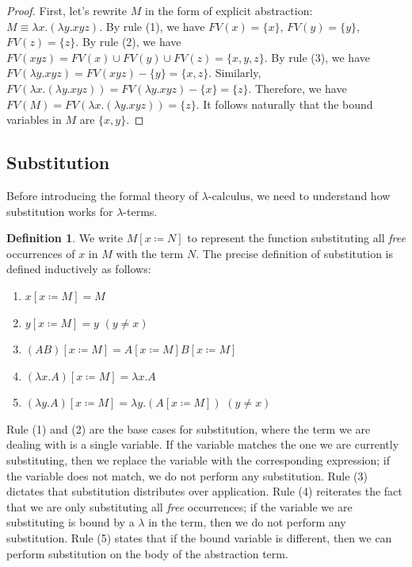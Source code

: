 \documentclass[a4paper,11pt]{article}
\theoremstyle{definition}
\newtheorem{definition}{Definition}[section]
\theoremstyle{example}
\theoremstyle{lemma}
\newcommand{\lcalc}{\lambda\text{-calculus}}
\newcommand{\lamterm}[2]{\lambda #1. #2}
\newcommand{\subs}[3]{#1[#2\coloneqq#3]}
\begin{document}
\begin{proof}
First, let's rewrite $M$ in the form of explicit abstraction: $M \equiv \lamterm{x}{(\lamterm{y}{xyz})}$. By rule (1), we have $FV(x) = \{x\}$, $FV(y) = \{y\}$, $FV(z) = \{z\}$. By rule (2), we have $FV(xyz) = FV(x) \cup FV(y) \cup FV(z) = \{x, y, z\}$. By rule (3), we have $FV(\lamterm{y}{xyz}) = FV(xyz) - \{y\} = \{x, z\}$. Similarly, $FV(\lamterm{x}{(\lamterm{y}{xyz})}) = FV(\lamterm{y}{xyz}) - \{x\} = \{z\}$. Therefore, we have $FV(M) = FV(\lamterm{x}{(\lamterm{y}{xyz})}) = \{z\}$. It follows naturally that the bound variables in $M$ are $\{x, y\}$.
\end{proof}

\subsection{Substitution}
Before introducing the formal theory of $\lcalc$, we need to understand how substitution works for $\lambda$-terms.

\begin{definition}
We write $\subs{M}{x}{N}$ to represent the function substituting all \textit{free} occurrences of $x$ in $M$ with the term $N$. The precise definition of substitution is defined inductively as follows:
\begin{enumerate}[topsep=1pt,itemsep=-1ex,partopsep=1ex,parsep=1ex]
    \item $\subs{x}{x}{M} = M$
    \item $\subs{y}{x}{M} = y$ $(y \neq x)$
    \item $\subs{(AB)}{x}{M} = \subs{A}{x}{M}\subs{B}{x}{M}$
    \item $\subs{(\lamterm{x}{A})}{x}{M} = \lamterm{x}{A}$
    \item $\subs{(\lamterm{y}{A})}{x}{M} = \lamterm{y}{(\subs{A}{x}{M})}$ $(y \neq x)$
\end{enumerate}
\end{definition}
Rule (1) and (2) are the base cases for substitution, where the term we are dealing with is a single variable. If the variable matches the one we are currently substituting, then we replace the variable with the corresponding expression; if the variable does not match, we do not perform any substitution. Rule (3) dictates that substitution distributes over application. Rule (4) reiterates the fact that we are only substituting all \textit{free} occurrences; if the variable we are substituting is bound by a $\lambda$ in the term, then we do not perform any substitution. Rule (5) states that if the bound variable is different, then we can perform substitution on the body of the abstraction term.
\end{document}
